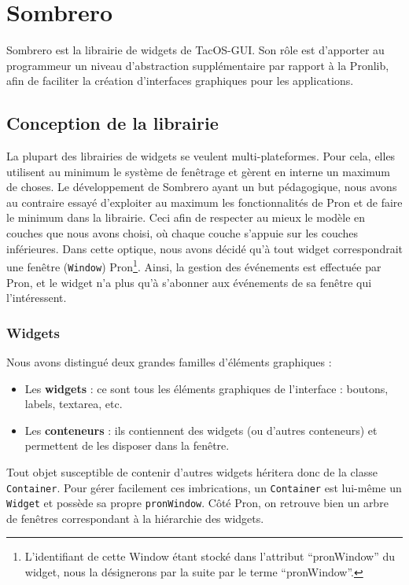 \section{Sombrero}

Sombrero est la librairie de widgets de TacOS-GUI.
Son rôle est d'apporter au programmeur un niveau d'abstraction supplémentaire par rapport à la Pronlib, afin de faciliter la création d'interfaces graphiques pour les applications.

\subsection{Conception de la librairie}
\label{Conception}

La plupart des librairies de widgets se veulent multi-plateformes.
Pour cela, elles utilisent au minimum le système de fenêtrage et gèrent en interne un maximum de choses.
Le développement de Sombrero ayant un but pédagogique, nous avons au contraire essayé d'exploiter au maximum les fonctionnalités de Pron et de faire le minimum dans la librairie. Ceci afin de respecter au mieux le modèle en couches que nous avons choisi, où chaque couche s'appuie sur les couches inférieures.
Dans cette optique, nous avons décidé qu'à tout widget correspondrait une fenêtre (\verb|Window|) Pron\footnote{L'identifiant de cette Window étant stocké dans l'attribut ``pronWindow'' du widget, nous la désignerons par la suite par le terme ``pronWindow''.}.
Ainsi, la gestion des événements est effectuée par Pron, et le widget n'a plus qu'à s'abonner aux événements de sa fenêtre qui l'intéressent.

\subsubsection{Widgets}

Nous avons distingué deux grandes familles d'éléments graphiques :

\begin{itemize}
  \item Les \textbf{widgets} : ce sont tous les éléments graphiques de l'interface : boutons, labels, textarea, etc.
  \item Les \textbf{conteneurs} : ils contiennent des widgets (ou d'autres conteneurs) et permettent de les disposer dans la fenêtre.
\end{itemize}

Tout objet susceptible de contenir d'autres widgets héritera donc de la classe \verb|Container|.
Pour gérer facilement ces imbrications, un \verb|Container| est lui-même un \verb|Widget| et possède sa propre \verb|pronWindow|.
Côté Pron, on retrouve bien un arbre de fenêtres correspondant à la hiérarchie des widgets.

